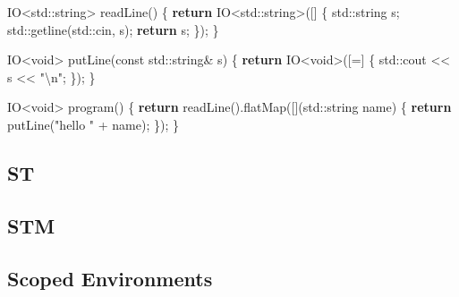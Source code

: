 \documentclass[]{article}
\newenvironment{Shaded}{}{}
\newcommand{\AttributeTok}[1]{\textcolor[rgb]{0.49,0.56,0.16}{#1}}
\newcommand{\BuiltInTok}[1]{\textcolor[rgb]{0.00,0.50,0.00}{#1}}
\newcommand{\ControlFlowTok}[1]{\textcolor[rgb]{0.00,0.44,0.13}{\textbf{#1}}}
\newcommand{\DataTypeTok}[1]{\textcolor[rgb]{0.56,0.13,0.00}{#1}}
\newcommand{\NormalTok}[1]{#1}
\newcommand{\OperatorTok}[1]{\textcolor[rgb]{0.40,0.40,0.40}{#1}}
\newcommand{\SpecialCharTok}[1]{\textcolor[rgb]{0.25,0.44,0.63}{#1}}
\newcommand{\StringTok}[1]{\textcolor[rgb]{0.25,0.44,0.63}{#1}}
\begin{document}
\begin{Shaded}
\begin{Highlighting}[]
\NormalTok{IO}\OperatorTok{\textless{}}\BuiltInTok{std::}\NormalTok{string}\OperatorTok{\textgreater{}}\NormalTok{ readLine}\OperatorTok{()} \OperatorTok{\{}
  \ControlFlowTok{return}\NormalTok{ IO}\OperatorTok{\textless{}}\BuiltInTok{std::}\NormalTok{string}\OperatorTok{\textgreater{}([]} \OperatorTok{\{}
    \BuiltInTok{std::}\NormalTok{string s}\OperatorTok{;}
    \BuiltInTok{std::}\NormalTok{getline}\OperatorTok{(}\BuiltInTok{std::}\NormalTok{cin}\OperatorTok{,}\NormalTok{ s}\OperatorTok{);}
    \ControlFlowTok{return}\NormalTok{ s}\OperatorTok{;}
  \OperatorTok{\});}
\OperatorTok{\}}

\NormalTok{IO}\OperatorTok{\textless{}}\DataTypeTok{void}\OperatorTok{\textgreater{}}\NormalTok{ putLine}\OperatorTok{(}\AttributeTok{const} \BuiltInTok{std::}\NormalTok{string}\OperatorTok{\&}\NormalTok{ s}\OperatorTok{)} \OperatorTok{\{}
  \ControlFlowTok{return}\NormalTok{ IO}\OperatorTok{\textless{}}\DataTypeTok{void}\OperatorTok{\textgreater{}([=]} \OperatorTok{\{}
    \BuiltInTok{std::}\NormalTok{cout }\OperatorTok{\textless{}\textless{}}\NormalTok{ s }\OperatorTok{\textless{}\textless{}} \StringTok{"}\SpecialCharTok{\textbackslash{}n}\StringTok{"}\OperatorTok{;}
  \OperatorTok{\});}
\OperatorTok{\}}

\NormalTok{IO}\OperatorTok{\textless{}}\DataTypeTok{void}\OperatorTok{\textgreater{}}\NormalTok{ program}\OperatorTok{()} \OperatorTok{\{}
  \ControlFlowTok{return}\NormalTok{ readLine}\OperatorTok{().}\NormalTok{flatMap}\OperatorTok{([](}\BuiltInTok{std::}\NormalTok{string name}\OperatorTok{)} \OperatorTok{\{}
    \ControlFlowTok{return}\NormalTok{ putLine}\OperatorTok{(}\StringTok{"hello "} \OperatorTok{+}\NormalTok{ name}\OperatorTok{);}
  \OperatorTok{\});}
\OperatorTok{\}}
\end{Highlighting}
\end{Shaded}

\subsection{ST}\label{st}

\subsection{STM}\label{stm}

\subsection{Scoped Environments}\label{scoped-environments}
\end{document}
